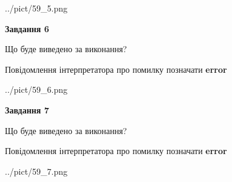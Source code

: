 \documentclass[10pt, ukrainian]{article}
\begin{document}
{\begin {large}
\begin{center}
	{../pict/59_5.png}
\end{center}
\newpage

{\begin {center}\textbf{Завдання 6}\end {center}}\par
Що буде виведено за виконання? \par
Повідомлення інтерпретатора про помилку позначати \textbf{error}

\begin{center}
	{../pict/59_6.png}
\end{center}
\newpage

{\begin {center}\textbf{Завдання 7}\end {center}}\par
Що буде виведено за виконання? \par
Повідомлення інтерпретатора про помилку позначати \textbf{error}

\begin{center}
	{../pict/59_7.png}
\end{center}
\newpage

\end {large}}
\end{document}
